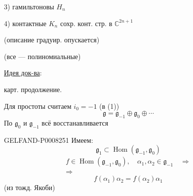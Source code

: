 3) гамильтоновы \(H_n\)

4) контактные \(K_n\) \qquad сохр. конт. стр. в \(\mathbb{C}^{2n+1}\)

(описание градуир. опускается)

(все — полиномиальные)

\uline{Идея док-ва}:

карт. продолжение.

Для простоты считаем \(i_0=-1\) (в (1))
\begin{equation*}
\mathfrak g=\mathfrak g_{-1}\oplus\mathfrak g_0\oplus\cdots\tag{6}
\end{equation*}
По \(\mathfrak g_0\) и \(\mathfrak g_{-1}\) всё восстанавливается


\begin{GelfandAdjacentEvidence}{GELFAND-P000825}{1}
Имеем:
\begin{equation*}
\mathfrak g_1\subset\operatorname{Hom}(\mathfrak g_{-1},\mathfrak g_0)\tag{7}
\end{equation*}
\[
\begin{gathered}
f\in\operatorname{Hom}(\mathfrak g_{-1},\mathfrak g_0),\quad
\alpha_1,\alpha_2\in\mathfrak g_{-1}\quad\Rightarrow\\
\Rightarrow
\end{gathered}
\]
\begin{equation*}
f(\alpha_1)\alpha_2=f(\alpha_2)\alpha_1\tag{8}
\end{equation*}
(из тожд. Якоби)
\end{GelfandAdjacentEvidence}
